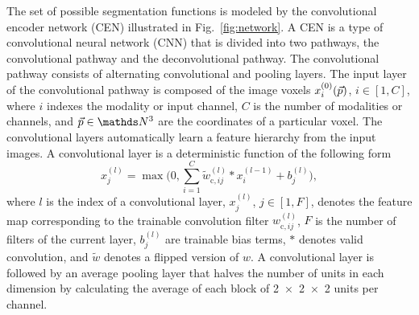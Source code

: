 The set of possible segmentation functions is modeled by the convolutional
encoder network (CEN) illustrated in Fig.~\ref{fig:network}. A CEN is a type of
convolutional neural network (CNN) \cite{LeCun1998} that is divided into two
pathways, the convolutional pathway and the deconvolutional \cite{zeiler2011}
pathway. The convolutional pathway consists of alternating convolutional and
pooling layers. The input layer of the convolutional pathway is composed of the
image voxels $x^{(0)}_i(\vec{p})$, $i \in [1, C]$, where $i$ indexes the
modality or input channel, $C$ is the number of modalities or channels, and
$\vect{p} \in \N^3$ are the coordinates of a particular voxel. The convolutional
layers automatically learn a feature hierarchy from the input images. A
convolutional layer is a deterministic function of the following form
\begin{equation}
x^{(l)}_j = \max \Bigg(0, \sum_{i=1}^C\tilde{w}^{(l)}_{\text{c},ij}*x^{(l-1)}_i
+ b^{(l)}_j\Bigg),
\end{equation}
where $l$ is the index of a convolutional layer, $x^{(l)}_j$, $j \in [1,F]$,
denotes the feature map corresponding to the trainable convolution filter
$w^{(l)}_{\text{c},ij}$, $F$ is the number of filters of the current layer,
$b^{(l)}_j$ are trainable bias terms, $*$ denotes valid convolution, and
$\tilde{w}$ denotes a flipped version of $w$. A convolutional layer is followed
by an average pooling layer \cite{scherer2010evaluation} that halves the number
of units in each dimension by calculating the average of each block of
\num{2x2x2} units per channel.


